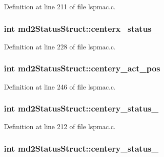 Definition at line 211 of file lspmac.c.\hypertarget{structmd2StatusStruct_ae4fad6debe138ed7815d463e83f8d0f6}{
\subsubsection[{centerx\_\-status\_\-2}]{\setlength{\rightskip}{0pt plus 5cm}int {\bf md2StatusStruct::centerx\_\-status\_}}}
\label{structmd2StatusStruct_ae4fad6debe138ed7815d463e83f8d0f6}


Definition at line 228 of file lspmac.c.\hypertarget{structmd2StatusStruct_a6be71a92a599d490ca808af8c7e7faa0}{
\subsubsection[{centery\_\-act\_\-pos}]{\setlength{\rightskip}{0pt plus 5cm}int {\bf md2StatusStruct::centery\_\-act\_\-pos}}}
\label{structmd2StatusStruct_a6be71a92a599d490ca808af8c7e7faa0}


Definition at line 246 of file lspmac.c.\hypertarget{structmd2StatusStruct_a57f65ebe28ef88f1c632d9f35d9167eb}{
\subsubsection[{centery\_\-status\_\-1}]{\setlength{\rightskip}{0pt plus 5cm}int {\bf md2StatusStruct::centery\_\-status\_}}}
\label{structmd2StatusStruct_a57f65ebe28ef88f1c632d9f35d9167eb}


Definition at line 212 of file lspmac.c.\hypertarget{structmd2StatusStruct_aa242098c185cce8f852cd6e081ef0b1d}{
\subsubsection[{centery\_\-status\_\-2}]{\setlength{\rightskip}{0pt plus 5cm}int {\bf md2StatusStruct::centery\_\-status\_}}}
\label{structmd2StatusStruct_aa242098c185cce8f852cd6e081ef0b1d}


